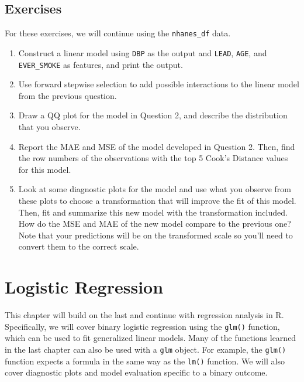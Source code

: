 \documentclass[
  letterpaper,
]{krantz}
\begin{document}
\hypertarget{exercises-8}{%
\section{Exercises}\label{exercises-8}}

For these exercises, we will continue using the \texttt{nhanes\_df}
data.

\begin{enumerate}
\def\labelenumi{\arabic{enumi}.}
\item
  Construct a linear model using \texttt{DBP} as the output and
  \texttt{LEAD}, \texttt{AGE}, and \texttt{EVER\_SMOKE} as features, and
  print the output.
\item
  Use forward stepwise selection to add possible interactions to the
  linear model from the previous question.
\item
  Draw a QQ plot for the model in Question 2, and describe the
  distribution that you observe.
\item
  Report the MAE and MSE of the model developed in Question 2. Then,
  find the row numbers of the observations with the top 5 Cook's
  Distance values for this model.
\item
  Look at some diagnostic plots for the model and use what you observe
  from these plots to choose a transformation that will improve the fit
  of this model. Then, fit and summarize this new model with the
  transformation included. How do the MSE and MAE of the new model
  compare to the previous one? Note that your predictions will be on the
  transformed scale so you'll need to convert them to the correct scale.
\end{enumerate}


\hypertarget{sec-logistic-regression}{%
\chapter{Logistic Regression}\label{sec-logistic-regression}}

This chapter will build on the last and continue with regression
analysis in R. Specifically, we will cover binary logistic regression
using the \texttt{glm()} function, which can be used to fit generalized
linear models. Many of the functions learned in the last chapter can
also be used with a \texttt{glm} object. For example, the \texttt{glm()}
function expects a formula in the same way as the \texttt{lm()}
function. We will also cover diagnostic plots and model evaluation
specific to a binary outcome.
\end{document}
